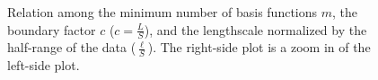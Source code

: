 \documentclass[]{interact}
\theoremstyle{plain}%
\theoremstyle{definition}
\theoremstyle{remark}
\begin{document}
\begin{figure}
\centering
{}
\caption{Relation among the minimum number of basis functions $m$, the boundary factor $c$ ($c = \frac{L}{S}$), and the lengthscale normalized by the half-range of the data ($\frac{\ell}{S}$). The right-side plot is a zoom in of the left-side plot.}
  \label{fig3_lscale_vs_J_vs_c}
\end{figure}
\end{document}
